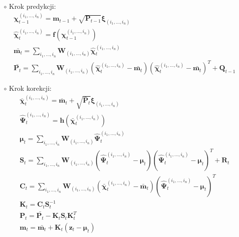 \begin{itemize}
	\item[$\circ$] Krok predykcji:
	\begin{align}\label{eq:GHKFAdditivePrediction}
	&\boldsymbol{\chi}^{(i_1, \dots, i_n)}_{t-1}=\boldsymbol{m}_{t-1}+\sqrt{\boldsymbol{P}_{t-1}}\boldsymbol{\xi}_{(i_1, \dots, i_n)} \nonumber \\
	&\hat{\boldsymbol{\chi}}^{(i_1, \dots, i_n)}_{t}=\boldsymbol{f}(\boldsymbol{\chi}^{(i_1, \dots, i_n)}_{t-1}) \nonumber \\
	&\bar{\boldsymbol{m}_t}=\sum_{i_1,\dots,i_n} \boldsymbol{W}_{(i_1, \dots, i_n)} \hat{\boldsymbol{\chi}}^{(i_1, \dots, i_n)}_{t} \nonumber \\
	&\bar{\boldsymbol{P}_t}=\sum_{i_1,\dots,i_n} \boldsymbol{W}_{(i_1, \dots, i_n)}(\hat{\boldsymbol{\chi}}^{(i_1, \dots, i_n)}_{t} - \bar{\boldsymbol{m}_t})(\hat{\boldsymbol{\chi}}^{(i_1, \dots, i_n)}_{t} - \bar{\boldsymbol{m}_t})^T + \boldsymbol{Q}_{t-1}
	\end{align}
	\item[$\circ$] Krok korekcji:
	\begin{align} \label{eq:GHKFAdditiveCorrection}
	&\bar{\boldsymbol{\chi}}^{(i_1, \dots, i_n)}_{t} = \bar{\boldsymbol{m}}_{t} + \sqrt{\bar{\boldsymbol{P}}_{t}} \boldsymbol{\xi}_{(i_1, \dots, i_n)} \nonumber \\
	&\hat{\boldsymbol{\Psi}}^{(i_1, \dots, i_n)}_{t} = \boldsymbol{h}(\bar{\boldsymbol{\chi}}^{(i_1, \dots, i_n)}_{t}) \nonumber \\
	&\boldsymbol{\mu}_t=\sum_{i_1,\dots,i_n} \boldsymbol{W}_{(i_1, \dots, i_n)} \hat{\boldsymbol{\Psi}}^{(i_1, \dots, i_n)}_{t} \nonumber \\
	&\boldsymbol{S}_t=\sum_{i_1,\dots,i_n} \boldsymbol{W}_{(i_1, \dots, i_n)}(\hat{\boldsymbol{\Psi}}^{(i_1, \dots, i_n)}_{t} - \boldsymbol{\mu}_t)(\hat{\boldsymbol{\Psi}}^{(i_1, \dots, i_n)}_{t} - \boldsymbol{\mu}_t)^T + \boldsymbol{R}_{t} \nonumber \\
	&\boldsymbol{C}_t = \sum_{i_1,\dots,i_n} \boldsymbol{W}_{(i_1, \dots, i_n)} (\bar{\boldsymbol{\chi}}^{(i_1, \dots, i_n)}_{t} - \bar{\boldsymbol{m}}_t)(\hat{\boldsymbol{\Psi}}^{(i_1, \dots, i_n)}_{t} - \boldsymbol{\mu}_t)^T \nonumber \\
	&\boldsymbol{K}_t=\boldsymbol{C}_t\boldsymbol{S}_t^{-1} \nonumber \\
	&\boldsymbol{P}_t=\bar{\mathbf{P}_{t}} - \boldsymbol{K}_t\boldsymbol{S}_t\boldsymbol{K}_t^T \nonumber \\
	&\boldsymbol{m}_t = \bar{\boldsymbol{m}_t} + \boldsymbol{K}_t(\boldsymbol{z}_t - \boldsymbol{\mu}_t)
	\end{align}
\end{itemize}

